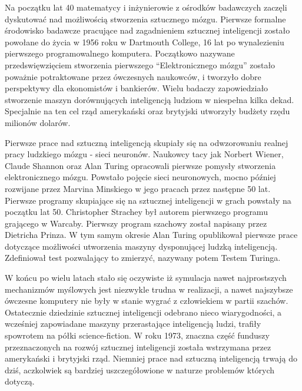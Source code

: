 \begin{par}
Na początku lat 40 matematycy i inżynierowie z ośrodków badawczych zaczęli dyskutować nad możliwością stworzenia sztucznego mózgu.
Pierwsze formalne środowisko badawcze pracujące nad zagadnieniem sztucznej inteligencji zostało powołane do życia w 1956 roku w Dartmouth College, 16 lat po wynalezieniu pierwszego programowalnego komputera.
Początkowo nazywane przedswięwzięciem stworzenia pierwszego ``Elektronicznego mózgu'' zostało poważnie potraktowane przez ówczesnych naukowców, i tworzyło dobre perspektywy dla ekonomistów i bankierów.
Wielu badaczy zapowiedziało stworzenie maszyn dorównujących inteligencją ludziom w niespełna kilka dekad.
Specjalnie na ten cel rząd amerykański oraz brytyjski utworzyły budżety rzędu milionów dolarów.
\end{par}
\begin{par}
Pierwsze prace nad sztuczną inteligencją skupiały się na odwzorowaniu realnej pracy ludzkiego mózgu - sieci neuronów.
Naukowcy tacy jak Norbert Wiener, Claude Shannon oraz Alan Turing opracowali pierwsze pomysły stworzenia elektronicznego mózgu.
Powstało pojęcie sieci neuronowych, mocno później rozwijane przez Marvina Minskiego w jego pracach przez następne 50 lat.
Pierwsze programy skupiające się na sztucznej inteligencji w grach powstały na początku lat 50. Christopher Strachey był autorem pierwszego programu grającego w Warcaby.
Pierwszy program szachowy został napisany przez Dietricha Prinza.
W tym samym okresie Alan Turing opublikował pierwsze prace dotyczące możliwości utworzenia maszyny dysponującej ludzką inteligencją.
Zdefiniował test pozwalający to zmierzyć, nazywany potem Testem Turinga.
\end{par}
\begin{par}
W końcu po wielu latach stało się oczywiste iż symulacja nawet najprostszych mechanizmów myślowych jest niezwykle trudna w realizacji, a nawet najszybsze ówczesne komputery nie były w stanie wygrać z człowiekiem w partii szachów. 
Ostatecznie dziedzinie sztucznej inteligencji odebrano nieco wiarygodności, a wcześniej zapowiadane maszyny przerastające inteligencją ludzi, trafiły spowrotem na półki science-fiction. W roku 1973, znaczna część funduszy przeznaczonych na rozwój sztucznej inteligencji została wstrzymana przez amerykański i brytyjski rząd.
Niemniej prace nad sztuczną inteligencją trwają do dziś, aczkolwiek są bardziej uszczegółowione w naturze problemów których dotyczą.
\end{par}
